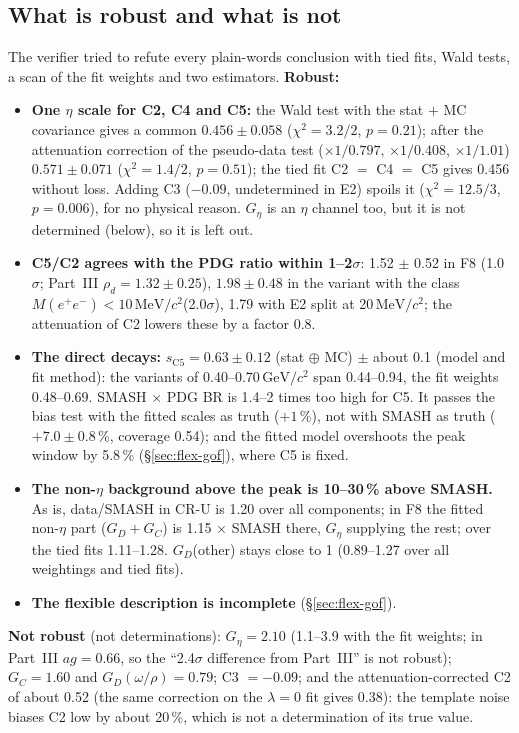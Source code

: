 \documentclass[11pt,a4paper]{article}
\newcommand{\Mee}{\ensuremath{M(e^{+}e^{-})}\xspace}
\newcommand{\GeVcc}{\ensuremath{\mathrm{GeV}/c^{2}}\xspace}
\newcommand{\MeVcc}{\ensuremath{\mathrm{MeV}/c^{2}}\xspace}
\newcommand{\rhod}{\ensuremath{\rho_d}\xspace}
\newcommand{\Geta}{\ensuremath{G_\eta}\xspace}
\begin{document}
\subsection{What is robust and what is not}
\label{sec:flex-robust}
The verifier tried to refute every plain-words conclusion with tied fits, Wald tests, a scan of the fit weights and two estimators.
\textbf{Robust:}
\begin{itemize}\setlength{\itemsep}{1pt}
\item \textbf{One $\eta$ scale for C2, C4 and C5:} the Wald test with the stat $+$ MC covariance gives a common $0.456\pm0.058$ ($\chi^2=3.2/2$, $p=0.21$);
      after the attenuation correction of the pseudo-data test ($\times1/0.797$, $\times1/0.408$, $\times1/1.01$) $0.571\pm0.071$ ($\chi^2=1.4/2$, $p=0.51$);
      the tied fit C2 $=$ C4 $=$ C5 gives 0.456 without loss. Adding C3 ($-0.09$, undetermined in E2) spoils it ($\chi^2=12.5/3$, $p=0.006$),
      for no physical reason. \Geta is an $\eta$ channel too, but it is not determined (below), so it is left out.
\item \textbf{C5/C2 agrees with the PDG ratio within 1--2$\sigma$}: 1.52 $\pm$ 0.52 in F8 (1.0$\sigma$; Part~III $\rhod=1.32\pm0.25$), $1.98\pm0.48$ in
      the variant with the class \Mee$<10$\,\MeVcc (2.0$\sigma$), 1.79 with E2 split at 20\,\MeVcc; the attenuation of C2 lowers these by a factor 0.8.
\item \textbf{The direct decays:} $s_{\mathrm{C5}}=0.63\pm0.12$ (stat $\oplus$ MC) $\pm$ about 0.1 (model and fit method): the variants of
      0.40--0.70\,\GeVcc span 0.44--0.94, the fit weights 0.48--0.69. SMASH $\times$ PDG BR is 1.4--2 times too high for C5. It passes the bias test
      with the fitted scales as truth ($+1$\,\%), not with SMASH as truth ($+7.0\pm0.8$\,\%, coverage 0.54); and the fitted model overshoots the peak
      window by 5.8\,\% (\S\ref{sec:flex-gof}), where C5 is fixed.
\item \textbf{The non-$\eta$ background above the peak is 10--30\,\% above SMASH.} As is, data/SMASH in CR-U is 1.20 over all components; in F8 the
      fitted non-$\eta$ part ($G_D+G_C$) is 1.15 $\times$ SMASH there, \Geta supplying the rest; over the tied fits 1.11--1.28. $G_D$(other) stays close
      to 1 (0.89--1.27 over all weightings and tied fits).
\item \textbf{The flexible description is incomplete} (\S\ref{sec:flex-gof}).
\end{itemize}
\textbf{Not robust} (not determinations): \Geta $=2.10$ (1.1--3.9 with the fit weights; in Part~III $ag=0.66$, so the ``2.4$\sigma$ difference from
Part~III'' is not robust); $G_C=1.60$ and $G_D(\omega/\rho)=0.79$; C3 $=-0.09$; and the attenuation-corrected C2 of about 0.52 (the same correction
on the $\lambda=0$ fit gives 0.38): the template noise biases C2 low by about 20\,\%, which is not a determination of its true value.
\end{document}
